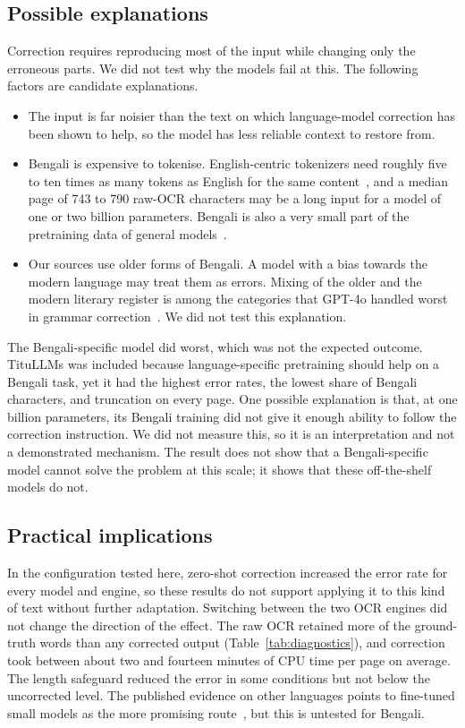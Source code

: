 \documentclass[conference]{IEEEtran}
\begin{document}
\subsection{Possible explanations}
Correction requires reproducing most of the input while changing only the erroneous parts. We did not test why the models fail at this. The following factors are candidate explanations.
\begin{itemize}
\item The input is far noisier than the text on which language-model correction has been shown to help, so the model has less reliable context to restore from.
\item Bengali is expensive to tokenise. English-centric tokenizers need roughly five to ten times as many tokens as English for the same content~\cite{petrov2023tokenizer,ahia2023cost}, and a median page of 743 to 790 raw-OCR characters may be a long input for a model of one or two billion parameters. Bengali is also a very small part of the pretraining data of general models~\cite{zehady2026banglallama}.
\item Our sources use older forms of Bengali. A model with a bias towards the modern language may treat them as errors. Mixing of the older and the modern literary register is among the categories that GPT-4o handled worst in grammar correction~\cite{bhattacharyya2025banglagec}. We did not test this explanation.
\end{itemize}
The Bengali-specific model did worst, which was not the expected outcome. TituLLMs was included because language-specific pretraining should help on a Bengali task, yet it had the highest error rates, the lowest share of Bengali characters, and truncation on every page. One possible explanation is that, at one billion parameters, its Bengali training did not give it enough ability to follow the correction instruction. We did not measure this, so it is an interpretation and not a demonstrated mechanism. The result does not show that a Bengali-specific model cannot solve the problem at this scale; it shows that these off-the-shelf models do not.

\subsection{Practical implications}
In the configuration tested here, zero-shot correction increased the error rate for every model and engine, so these results do not support applying it to this kind of text without further adaptation. Switching between the two OCR engines did not change the direction of the effect. The raw OCR retained more of the ground-truth words than any corrected output (Table~\ref{tab:diagnostics}), and correction took between about two and fourteen minutes of CPU time per page on average. The length safeguard reduced the error in some conditions but not below the uncorrected level. The published evidence on other languages points to fine-tuned small models as the more promising route~\cite{kumar2026postasr,thomas2024leveraging}, but this is untested for Bengali.
\end{document}
